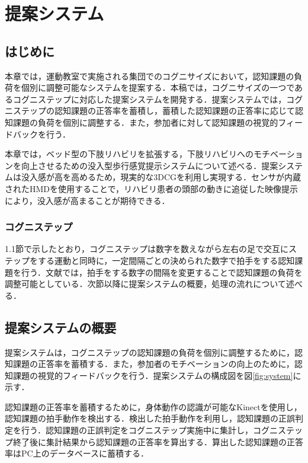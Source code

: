 \chapter{提案システム}

\thispagestyle{myheadings}

\section{はじめに}
本章では，運動教室で実施される集団でのコグニサイズにおいて，認知課題の負荷を個別に調整可能なシステムを提案する．本稿では，コグニサイズの一つであるコグニステップに対応した提案システムを開発する．提案システムでは，コグニステップの認知課題の正答率を蓄積し，蓄積した認知課題の正答率に応じて認知課題の負荷を個別に調整する．また，参加者に対して認知課題の視覚的フィードバックを行う．

本章では，ベッド型の下肢リハビリを拡張する，下肢リハビリへのモチベーションを向上させるための没入型歩行感覚提示システムについて述べる．提案システムは没入感が高を高めるため，現実的な3DCGを利用し実現する．センサが内蔵されたHMDを使用することで，リハビリ患者の頭部の動きに追従した映像提示により，没入感が高まることが期待できる．
\fi

\subsection{コグニステップ}
1.1節で示したとおり，コグニステップは数字を数えながら左右の足で交互にステップをする運動と同時に，一定間隔ごとの決められた数字で拍手をする認知課題を行う．文献\cite{認知症予防へ向けた運動コグニサイズ}では，拍手をする数字の間隔を変更することで認知課題の負荷を調整可能としている．次節以降に提案システムの概要，処理の流れについて述べる．

\section{提案システムの概要}
提案システムは，コグニステップの認知課題の負荷を個別に調整するために，認知課題の正答率を蓄積する．また，参加者のモチベーションの向上のために，認知課題の視覚的フィードバックを行う．提案システムの構成図を図\ref{fig:system}に示す．

認知課題の正答率を蓄積するために，身体動作の認識が可能なKinectを使用し，認知課題の拍手動作を検出する．検出した拍手動作を利用し，認知課題の正誤判定を行う．認知課題の正誤判定をコグニステップ実施中に集計し，コグニステップ終了後に集計結果から認知課題の正答率を算出する．算出した認知課題の正答率はPC上のデータベースに蓄積する．

